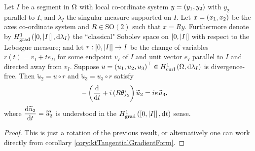 \begin{prop} \label{prop:DivFreeGeneralSegment}
	Let $I$ be a segment in $\Omega$ with local co-ordinate system $y=\left( y_1,y_2 \right)$ with $y_2$ parallel to $I$, and $\lambda_I$ the singular measure supported on $I$.
	Let $x=\left( x_1,x_2 \right)$ be the axes co-ordinate system and $R\in\mathrm{SO}(2)$ such that $x=Ry$.
	Furthermore denote by $H^1_\mathrm{grad}\left( \left[ 0,\left\lvert I \right\rvert \right], \mathrm{d}\lambda_I \right)$ the ``classical" Sobolev space on $\left[ 0,\left\lvert I \right\rvert \right]$ with respect to the Lebesgue measure; and let $r:\left[ 0,\left\lvert I \right\rvert \right]\rightarrow I$ be the change of variables $r(t)= v_I + t e_I$, for some endpoint $v_I$ of $I$ and unit vector $e_I$ parallel to $I$ and directed away from $v_I$.
	Suppose $u=\left( u_1, u_2, u_3 \right)^\top\in H^1_\mathrm{curl}\left( \Omega, \mathrm{d}\lambda_I \right)$ is divergence-free.
	Then $\widetilde{u}_2 = u \circ r$ and $\widetilde{u}_3 = u_3 \circ r$ satisfy
	\begin{align*}
		-\left( \dfrac{\mathrm{d}}{\mathrm{d}t} + i\left( R\theta \right)_2 \right)\widetilde{u}_2 &= i\kappa\widetilde{u}_3,
	\end{align*}
	where $\dfrac{\mathrm{d}\widetilde{u}_2}{\mathrm{d}t} = \widetilde{u}'_2$ is understood in the $H^1_\mathrm{grad}\left( \left[ 0,\left\lvert I \right\rvert \right], \mathrm{d}t \right)$ sense.
\end{prop}
\begin{proof}
	This is just a rotation of the previous result, or alternatively one can work directly from corollary \ref{cory:ktTangentialGradientForm}.
\end{proof}

